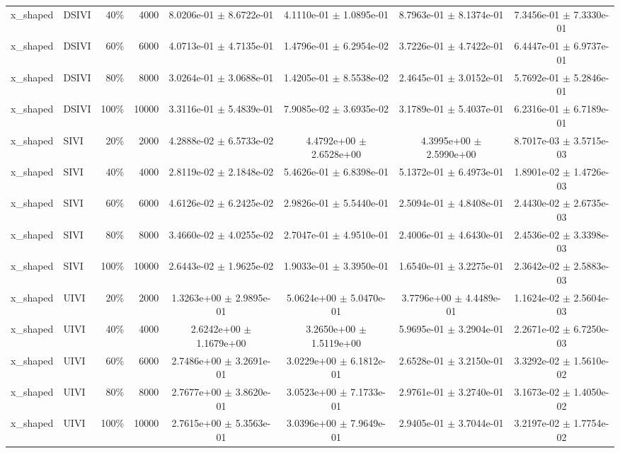 \begin{tabular}{llrrcccc}
x\_shaped & DSIVI & 40\% & 4000 & 8.0206e-01 $\pm$ 8.6722e-01 & 4.1110e-01 $\pm$ 1.0895e-01 & 8.7963e-01 $\pm$ 8.1374e-01 & 7.3456e-01 $\pm$ 7.3330e-01 \\
x\_shaped & DSIVI & 60\% & 6000 & 4.0713e-01 $\pm$ 4.7135e-01 & 1.4796e-01 $\pm$ 6.2954e-02 & 3.7226e-01 $\pm$ 4.7422e-01 & 6.4447e-01 $\pm$ 6.9737e-01 \\
x\_shaped & DSIVI & 80\% & 8000 & 3.0264e-01 $\pm$ 3.0688e-01 & 1.4205e-01 $\pm$ 8.5538e-02 & 2.4645e-01 $\pm$ 3.0152e-01 & 5.7692e-01 $\pm$ 5.2846e-01 \\
x\_shaped & DSIVI & 100\% & 10000 & 3.3116e-01 $\pm$ 5.4839e-01 & 7.9085e-02 $\pm$ 3.6935e-02 & 3.1789e-01 $\pm$ 5.4037e-01 & 6.2316e-01 $\pm$ 6.7189e-01 \\
x\_shaped & SIVI & 20\% & 2000 & 4.2888e-02 $\pm$ 6.5733e-02 & 4.4792e+00 $\pm$ 2.6528e+00 & 4.3995e+00 $\pm$ 2.5990e+00 & 8.7017e-03 $\pm$ 3.5715e-03 \\
x\_shaped & SIVI & 40\% & 4000 & 2.8119e-02 $\pm$ 2.1848e-02 & 5.4626e-01 $\pm$ 6.8398e-01 & 5.1372e-01 $\pm$ 6.4973e-01 & 1.8901e-02 $\pm$ 1.4726e-03 \\
x\_shaped & SIVI & 60\% & 6000 & 4.6126e-02 $\pm$ 6.2425e-02 & 2.9826e-01 $\pm$ 5.5440e-01 & 2.5094e-01 $\pm$ 4.8408e-01 & 2.4430e-02 $\pm$ 2.6735e-03 \\
x\_shaped & SIVI & 80\% & 8000 & 3.4660e-02 $\pm$ 4.0255e-02 & 2.7047e-01 $\pm$ 4.9510e-01 & 2.4006e-01 $\pm$ 4.6430e-01 & 2.4536e-02 $\pm$ 3.3398e-03 \\
x\_shaped & SIVI & 100\% & 10000 & 2.6443e-02 $\pm$ 1.9625e-02 & 1.9033e-01 $\pm$ 3.3950e-01 & 1.6540e-01 $\pm$ 3.2275e-01 & 2.3642e-02 $\pm$ 2.5883e-03 \\
x\_shaped & UIVI & 20\% & 2000 & 1.3263e+00 $\pm$ 2.9895e-01 & 5.0624e+00 $\pm$ 5.0470e-01 & 3.7796e+00 $\pm$ 4.4489e-01 & 1.1624e-02 $\pm$ 2.5604e-03 \\
x\_shaped & UIVI & 40\% & 4000 & 2.6242e+00 $\pm$ 1.1679e+00 & 3.2650e+00 $\pm$ 1.5119e+00 & 5.9695e-01 $\pm$ 3.2904e-01 & 2.2671e-02 $\pm$ 6.7250e-03 \\
x\_shaped & UIVI & 60\% & 6000 & 2.7486e+00 $\pm$ 3.2691e-01 & 3.0229e+00 $\pm$ 6.1812e-01 & 2.6528e-01 $\pm$ 3.2150e-01 & 3.3292e-02 $\pm$ 1.5610e-02 \\
x\_shaped & UIVI & 80\% & 8000 & 2.7677e+00 $\pm$ 3.8620e-01 & 3.0523e+00 $\pm$ 7.1733e-01 & 2.9761e-01 $\pm$ 3.2740e-01 & 3.1673e-02 $\pm$ 1.4050e-02 \\
x\_shaped & UIVI & 100\% & 10000 & 2.7615e+00 $\pm$ 5.3563e-01 & 3.0396e+00 $\pm$ 7.9649e-01 & 2.9405e-01 $\pm$ 3.7044e-01 & 3.2197e-02 $\pm$ 1.7754e-02 \\
\bottomrule
\end{tabular}
